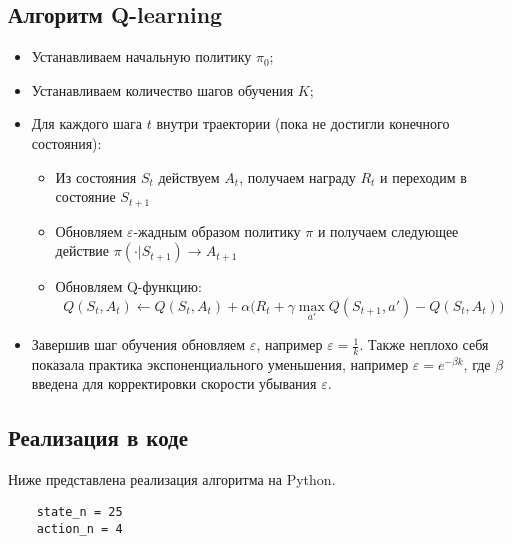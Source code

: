 \subsection{Алгоритм Q-learning}
\begin{itemize}
	\item Устанавливаем начальную политику $\pi_0$;
	\item Устанавливаем количество шагов обучения $K$;
	\item Для каждого шага $t$ внутри траектории (пока не достигли конечного состояния):
	\begin{itemize}
		\item Из состояния $S_t$ действуем $A_t$, получаем награду $R_t$ и переходим в состояние $S_{t+1}$
		\item Обновляем $\varepsilon$-жадным образом политику $\pi$ и получаем следующее действие $\pi(\cdot|S_{t+1}) \to A_{t+1}$
		\item Обновляем Q-функцию:
		$$Q(S_t, A_t) \gets Q(S_t, A_t) + \alpha\big( R_t + \gamma \max_{a'}Q(S_{t+1}, a') - Q(S_t, A_t) \big)$$
	\end{itemize}
	\item Завершив шаг обучения обновляем $\varepsilon$, например $\varepsilon = \frac{1}{k}$. Также неплохо себя показала практика экспоненциального уменьшения, например $\varepsilon = e^{-\beta k}$, где $\beta$ введена для корректировки скорости убывания $\varepsilon$.
	
\end{itemize}

\subsection{Реализация в коде}

Ниже представлена реализация алгоритма на Python.


\begin{lstlisting}
	state_n = 25
	action_n = 4
\end{lstlisting}
